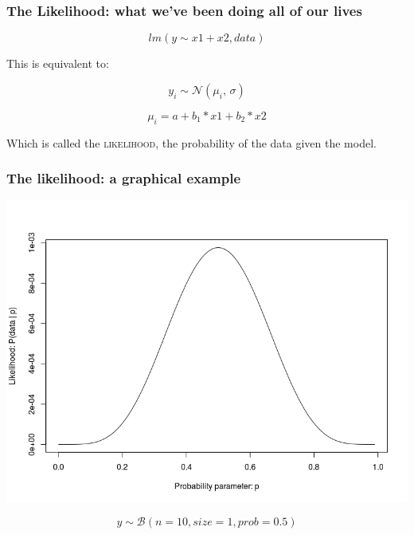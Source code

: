 \documentclass{beamer}
\begin{document}
 
 \begin{frame}
  \frametitle{\bf The Likelihood: what we've been doing all of our lives}
  
 \[
  lm(y \sim x1 + x2, data)
 \]

  
  This is equivalent to:
  
  \[
   y_i \sim \mathcal{N}(\mu_i,\, \sigma)   
   \]
   
   \[
    \mu_i = a + b_1 * x1 + b_2 * x2
   \]

Which is called the \textsc{likelihood}, the probability of the data given the model. 
   
  
  
 \end{frame}
 
 \begin{frame}
  \frametitle{\bf The likelihood: a graphical example}
  
  \includegraphics[width=\textwidth,height=.75\textheight,keepaspectratio]{likelihood.png}
  
  \[
   y \sim \mathcal{B}(n = 10,size = 1,prob = 0.5)
  \]
  

  
 \end{frame}
\end{document}
